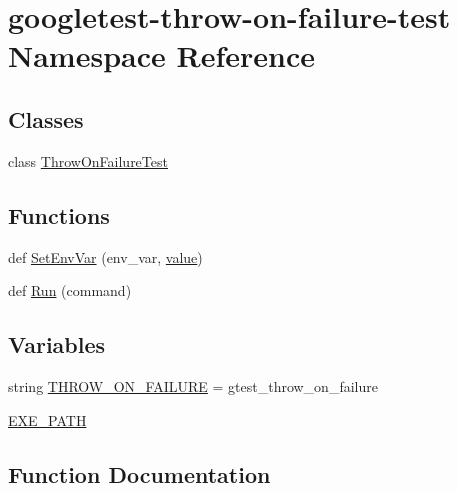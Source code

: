 \hypertarget{namespacegoogletest-throw-on-failure-test}{}\section{googletest-\/throw-\/on-\/failure-\/test Namespace Reference}
\label{namespacegoogletest-throw-on-failure-test}
\subsection*{Classes}
\begin{DoxyCompactItemize}
\item 
class \mbox{\hyperlink{classgoogletest-throw-on-failure-test_1_1_throw_on_failure_test}{Throw\+On\+Failure\+Test}}
\end{DoxyCompactItemize}
\subsection*{Functions}
\begin{DoxyCompactItemize}
\item 
def \mbox{\hyperlink{namespacegoogletest-throw-on-failure-test_a2e2bb374a68e4ae1db7c359b8005cbcc}{Set\+Env\+Var}} (env\+\_\+var, \mbox{\hyperlink{_obj__test_2lib_2googletest-master_2googlemock_2test_2gmock-matchers__test_8cc_a337b8a670efc0b086ad3af163f3121b6}{value}})
\item 
def \mbox{\hyperlink{namespacegoogletest-throw-on-failure-test_a937ab7ba6dcd93d71b1997f2bbfe3804}{Run}} (command)
\end{DoxyCompactItemize}
\subsection*{Variables}
\begin{DoxyCompactItemize}
\item 
string \mbox{\hyperlink{namespacegoogletest-throw-on-failure-test_a7c90464af153ebb6f0e221d66dbc71f1}{T\+H\+R\+O\+W\+\_\+\+O\+N\+\_\+\+F\+A\+I\+L\+U\+RE}} = \textquotesingle{}gtest\+\_\+throw\+\_\+on\+\_\+failure\textquotesingle{}
\item 
\mbox{\hyperlink{namespacegoogletest-throw-on-failure-test_a9cf7f6bcb466c8346b1aacec917a09c1}{E\+X\+E\+\_\+\+P\+A\+TH}}
\end{DoxyCompactItemize}


\subsection{Function Documentation}
\mbox{\label{namespacegoogletest-throw-on-failure-test_a937ab7ba6dcd93d71b1997f2bbfe3804}} 
